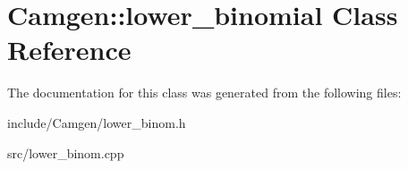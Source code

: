 \hypertarget{a00330}{\section{Camgen\-:\-:lower\-\_\-binomial Class Reference}
\label{a00330}
}


The documentation for this class was generated from the following files\-:\begin{DoxyCompactItemize}
\item 
include/\-Camgen/lower\-\_\-binom.\-h\item 
src/lower\-\_\-binom.\-cpp\end{DoxyCompactItemize}
